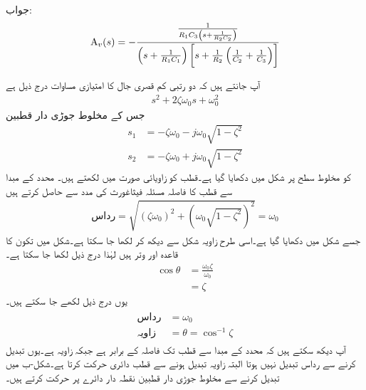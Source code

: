 جواب:
\begin{align*}
{\ensuremath{{\textup{A}}}}_v(s)=-\frac{\frac{1}{R_1 C_3 \left(s+\frac{1}{R_2 C_2}\right)}}{\left(s+\frac{1}{R_1C_1}\right)\left[s+\frac{1}{R_2}\left(\frac{1}{C_2}+\frac{1}{C_3}\right)\right]}
\end{align*}

آپ جانتے ہیں کہ دو رتبی کم قصری جال کا امتیازی مساوات درج ذیل ہے
\begin{align*}
s^2+2\zeta \omega_0 s+\omega_0^2
\end{align*}
جس کے مخلوط جوڑی دار قطبین
\begin{align*}
s_1&=-\zeta \omega_0-j\omega_0 \sqrt{1-\zeta^2}\\
s_2&=-\zeta \omega_0+j\omega_0 \sqrt{1-\zeta^2}
\end{align*}
کو مخلوط سطح پر شکل  میں دکھایا گیا ہے۔قطب  کو زاویائی صورت میں لکھتے ہیں۔ محدد کے مبدا  سے قطب کا فاصلہ مسئلہ فیثاغورث کی مدد سے حاصل کرتے ہیں
\begin{align*}
\text{رداس}=\sqrt{(\zeta \omega_0)^2+\left(\omega_0\sqrt{1-\zeta^2}\right)^2}=\omega_0
\end{align*}
جسے شکل میں   دکھایا گیا ہے۔اسی طرح زاویہ  شکل سے دیکھ کر لکھا جا سکتا ہے۔شکل میں تکون کا قاعدہ  اور وتر  ہیں لہٰذا درج ذیل لکھا جا سکتا ہے۔
\begin{align*}
\cos \theta&=\frac{\omega_0 \zeta}{\omega_0}\\
&=\zeta
\end{align*}
یوں درج ذیل لکھے جا سکتے ہیں۔
\begin{gather}
\begin{aligned}
\text{رداس}&=\omega_0\\
\text{زاویہ}&=\theta=\cos^{-1} \zeta
\end{aligned}
\end{gather}
آپ دیکھ سکتے ہیں کہ محدد کے مبدا سے قطب تک فاصلہ  کے برابر ہے جبکہ زاویہ  ہے۔یوں  تبدیل کرنے سے رداس تبدیل نہیں ہوتا البتہ زاویہ تبدیل ہونے سے قطب دائری حرکت کرتا ہے۔شکل-ب میں  تبدیل کرنے سے مخلوط جوڑی دار قطبین نقطہ دار دائرے پر حرکت کرتے ہیں۔
